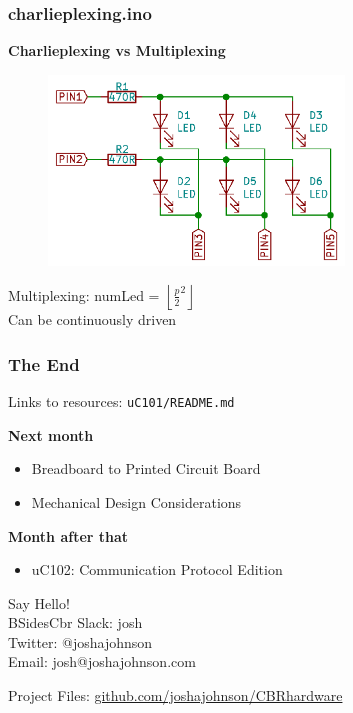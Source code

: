 \documentclass[t]{beamer}
\begin{document}

\begin{frame}[t]
\frametitle{charlieplexing.ino}
\textbf{Charlieplexing vs Multiplexing}

\begin{figure}
	\includegraphics[width=0.7\textwidth]{multiPlexing.PNG}
\end{figure}
\centering
Multiplexing: numLed = $\left \lfloor{\frac{p}{2}^2}\right \rfloor$ \\
Can be continuously driven 

\end{frame}



\begin{frame}
\frametitle{The End}
Links to resources: \texttt{uC101/README.md}
\vspace{5mm}

\textbf{Next month}
\begin{itemize}
	\item Breadboard to Printed Circuit Board
	\item Mechanical Design Considerations	
\end{itemize}
\vspace{3mm}
\textbf{Month after that}
\begin{itemize}
	\item uC102: Communication Protocol Edition	
\end{itemize}

\vspace{5mm}
Say Hello! \\
BSidesCbr Slack: josh\\
Twitter:  @\textunderscore joshajohnson\\
Email: josh@joshajohnson.com\\
\vspace{4mm}

Project Files: \url{github.com/joshajohnson/CBRhardware}\\\end{frame}
\end{document}
